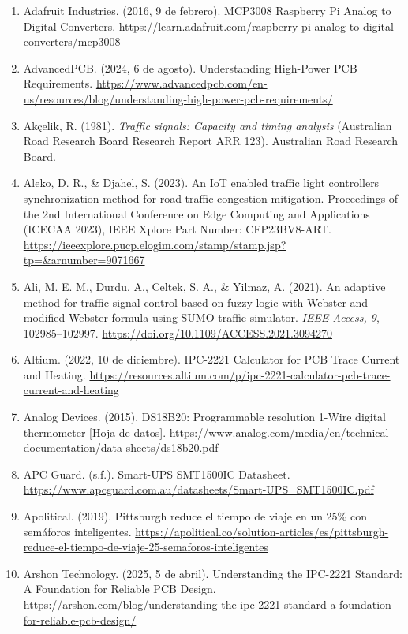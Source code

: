 \begin{enumerate}
\def\labelenumi{\arabic{enumi}.}
\item
  Adafruit Industries. (2016, 9 de febrero). MCP3008 \textbar{} Raspberry Pi Analog to Digital Converters. \url{https://learn.adafruit.com/raspberry-pi-analog-to-digital-converters/mcp3008}
\item
  AdvancedPCB. (2024, 6 de agosto). Understanding High-Power PCB Requirements. \url{https://www.advancedpcb.com/en-us/resources/blog/understanding-high-power-pcb-requirements/}
\item
  Akçelik, R. (1981). \emph{Traffic signals: Capacity and timing analysis} (Australian Road Research Board Research Report ARR 123). Australian Road Research Board.
\item
  Aleko, D. R., \& Djahel, S. (2023). An IoT enabled traffic light controllers synchronization method for road traffic congestion mitigation. Proceedings of the 2nd International Conference on Edge Computing and Applications (ICECAA 2023), IEEE Xplore Part Number: CFP23BV8-ART. \url{https://ieeexplore.pucp.elogim.com/stamp/stamp.jsp?tp=&arnumber=9071667}
\item
  Ali, M. E. M., Durdu, A., Celtek, S. A., \& Yilmaz, A. (2021). An adaptive method for traffic signal control based on fuzzy logic with Webster and modified Webster formula using SUMO traffic simulator. \emph{IEEE Access, 9}, 102985--102997. \url{https://doi.org/10.1109/ACCESS.2021.3094270}
\item
  Altium. (2022, 10 de diciembre). IPC-2221 Calculator for PCB Trace Current and Heating. \url{https://resources.altium.com/p/ipc-2221-calculator-pcb-trace-current-and-heating}
\item
  Analog Devices. (2015). DS18B20: Programmable resolution 1-Wire digital thermometer {[}Hoja de datos{]}. \url{https://www.analog.com/media/en/technical-documentation/data-sheets/ds18b20.pdf}
\item
  APC Guard. (s.f.). Smart-UPS SMT1500IC Datasheet. \url{https://www.apcguard.com.au/datasheets/Smart-UPS_SMT1500IC.pdf}
\item
  Apolitical. (2019). Pittsburgh reduce el tiempo de viaje en un 25\% con semáforos inteligentes. \url{https://apolitical.co/solution-articles/es/pittsburgh-reduce-el-tiempo-de-viaje-25-semaforos-inteligentes}
\item
  Arshon Technology. (2025, 5 de abril). Understanding the IPC-2221 Standard: A Foundation for Reliable PCB Design. \url{https://arshon.com/blog/understanding-the-ipc-2221-standard-a-foundation-for-reliable-pcb-design/}

\end{enumerate}
